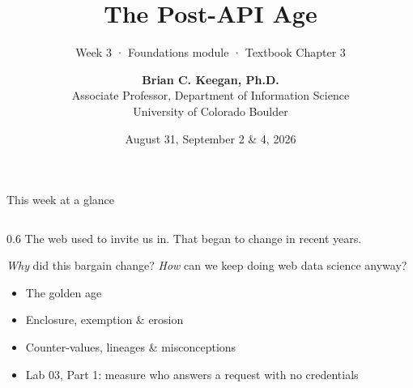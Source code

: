 \documentclass[9pt,aspectratio=169]{beamer}
\title[Week 3 · Post-API Age]{{\Huge The Post-API Age}}
\subtitle{Week 3 · Foundations module · Textbook Chapter 3}
\author[Keegan]{\textbf{Brian C. Keegan, Ph.D.} \\ Associate Professor, Department of Information Science \\ University of Colorado Boulder}
\date{August 31, September 2 \& 4, 2026}
\begin{document}
\maketitle

\begin{frame}{This week at a glance}
    \begin{columns}[T]
        \begin{column}{0.6\textwidth}
            The web used to invite us in. That began to change in recent years. 

            \bigskip
            
            \textit{Why} did this bargain change? \textit{How} can we keep doing web data science anyway?

            \bigskip

            \begin{itemize}\small
                \item The golden age
                \item Enclosure, exemption \& erosion
                \item Counter-values, lineages \& misconceptions
            \end{itemize}

            \medskip

            \begin{itemize}\small
                \item Lab 03, Part 1: measure who answers a request with no credentials
            \end{itemize}

            \medskip


\end{column}
\end{columns}
\end{frame}
\end{document}
